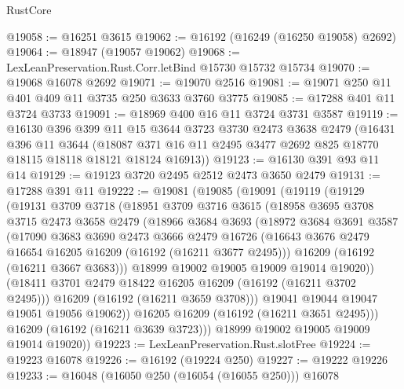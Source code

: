 \begin{lexlean}{RustCore}
\begin{coremodule}
@19058 := @16251 @3615
@19062 := @16192 (@16249 (@16250 @19058) @2692)
@19064 := @18947 (@19057 @19062)
@19068 := LexLeanPreservation.Rust.Corr.letBind @15730 @15732 @15734
@19070 := @19068 @16078 @2692
@19071 := @19070 @2516
@19081 := @19071 @250 @11 @401 @409 @11 @3735 @250 @3633 @3760 @3775
@19085 := @17288 @401 @11 @3724 @3733
@19091 := @18969 @400 @16 @11 @3724 @3731 @3587
@19119 := @16130
    @396
    @399
    @11
    @15
    @3644
    @3723
    @3730
    @2473
    @3638
    @2479
    (@16431
      @396
      @11
      @3644
      (@18087 @371 @16 @11 @2495 @3477 @2692 @825 @18770 @18115 @18118 @18121 @18124 @16913))
@19123 := @16130 @391 @93 @11 @14
@19129 := @19123 @3720 @2495 @2512 @2473 @3650 @2479
@19131 := @17288 @391 @11
@19222 := @19081
    (@19085
      (@19091
        (@19119
          (@19129
            (@19131
              @3709
              @3718
              (@18951
                @3709
                @3716
                @3615
                (@18958
                  @3695
                  @3708
                  @3715
                  @2473
                  @3658
                  @2479
                  (@18966
                    @3684
                    @3693
                    (@18972
                      @3684
                      @3691
                      @3587
                      (@17090
                        @3683
                        @3690
                        @2473
                        @3666
                        @2479
                        @16726
                        (@16643 @3676 @2479 @16654 @16205 @16209 (@16192 (@16211 @3677 @2495)))
                        @16209
                        (@16192 (@16211 @3667 @3683)))
                      @18999
                      @19002
                      @19005
                      @19009
                      @19014
                      @19020))
                  (@18411 @3701 @2479 @18422 @16205 @16209 (@16192 (@16211 @3702 @2495)))
                  @16209
                  (@16192 (@16211 @3659 @3708)))
                @19041
                @19044
                @19047
                @19051
                @19056
                @19062))
            @16205
            @16209
            (@16192 (@16211 @3651 @2495)))
          @16209
          (@16192 (@16211 @3639 @3723)))
        @18999
        @19002
        @19005
        @19009
        @19014
        @19020))
@19223 := LexLeanPreservation.Rust.slotFree
@19224 := @19223 @16078
@19226 := @16192 (@19224 @250)
@19227 := @19222 @19226
@19233 := @16048 (@16050 @250 (@16054 (@16055 @250))) @16078

\end{coremodule}
\end{lexlean}
